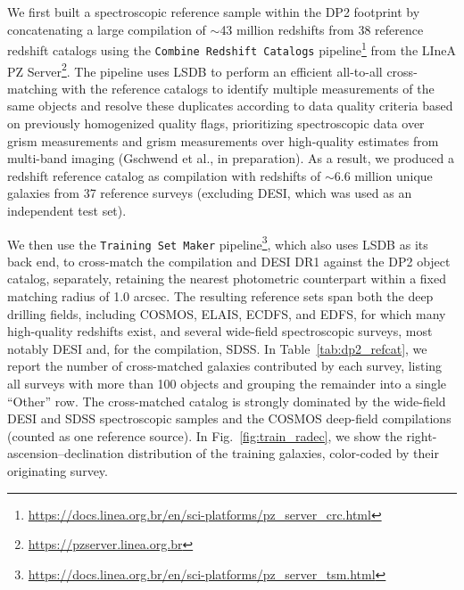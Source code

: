 We first built a spectroscopic reference sample within the DP2 footprint by concatenating a large compilation of $\sim$43 million redshifts from 38 reference redshift catalogs using the \texttt{Combine Redshift Catalogs} pipeline\footnote{\url{https://docs.linea.org.br/en/sci-platforms/pz_server_crc.html}} from the LIneA PZ Server\footnote{\url{https://pzserver.linea.org.br}}. The pipeline uses \textsc{LSDB} to perform an efficient all-to-all cross-matching with the reference catalogs to identify multiple measurements of the same objects and resolve these duplicates according to data quality criteria based on previously homogenized quality flags, prioritizing spectroscopic data over grism measurements and grism measurements over high-quality \photoz estimates from multi-band imaging (Gschwend et al., in preparation). As a result, we produced a redshift reference catalog as compilation with redshifts of $\sim$6.6 million unique galaxies from 37 reference surveys (excluding DESI, which was used as an independent test set).     

We then use the \texttt{Training Set Maker} pipeline\footnote{\url{https://docs.linea.org.br/en/sci-platforms/pz_server_tsm.html}}, which also uses \textsc{LSDB} as its back end, to cross-match the compilation and DESI DR1 against the DP2 object catalog, separately, retaining the nearest photometric counterpart within a fixed matching radius of 1.0 arcsec. The resulting reference sets span both the deep drilling fields, including COSMOS, ELAIS, ECDFS, and EDFS, for which many high-quality redshifts exist, and several wide-field spectroscopic surveys, most notably DESI and, for the compilation, SDSS. In Table~\ref{tab:dp2_refcat}, we report the number of cross-matched galaxies contributed by each survey, listing all surveys with more than 100 objects and grouping the remainder into a single ``Other'' row.  The cross-matched catalog is strongly dominated by the wide-field DESI and SDSS spectroscopic samples and the COSMOS deep-field compilations (counted as one reference source). In Fig.~\ref{fig:train_radec}, we show the right-ascension--declination distribution of the training galaxies, color-coded by their originating survey.

